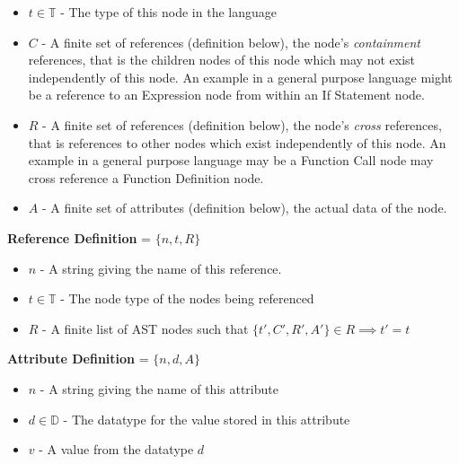 \documentclass{report}
\begin{document}
\begin{itemize}
\item $t\in \mathbb{T}$ - The type of this node in the language
\item $C$ - A finite set of references (definition below), the node's \emph{containment} references, that is the children nodes of this node which may not exist independently of this node. An example in a general purpose language might be a reference to an Expression node from within an If Statement node.
\item $R$ - A finite set of references (definition below), the node's \emph{cross} references, that is references to other nodes which exist independently of this node. An example in a general purpose language may be a Function Call node may cross reference a Function Definition node.
\item $A$ - A finite set of attributes (definition below), the actual data of the node.
\end{itemize}
%
\textbf{Reference Definition} = $\{n,t,R\}$ 
\begin{itemize}
\item $n$ - A string giving the name of this reference.
\item $t\in \mathbb{T}$ - The node type of the nodes being referenced 
\item $R$ - A finite list of AST nodes such that $\{t',C',R',A'\} \in R \implies t'=t$
\end{itemize}
%
\textbf{Attribute Definition} = $\{n,d,A\}$ 
\begin{itemize}
\item $n$ - A string giving the name of this attribute
\item $d\in \mathbb{D}$ - The datatype for the value stored in this attribute
\item $v$ - A value from the datatype $d$
\end{itemize}


\end{document}
